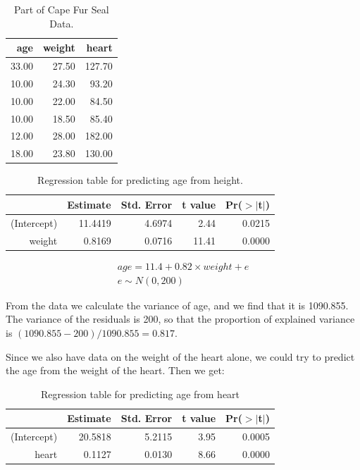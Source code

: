 \documentclass[]{book}\usepackage[]{graphicx}\usepackage[]{color}
\begin{document}
\begin{table}[ht]
\centering
\caption{Part of Cape Fur Seal Data.} 
\label{tab:multi_2}
\begin{tabular}{rrr}
  \hline
age & weight & heart \\ 
  \hline
33.00 & 27.50 & 127.70 \\ 
  10.00 & 24.30 & 93.20 \\ 
  10.00 & 22.00 & 84.50 \\ 
  10.00 & 18.50 & 85.40 \\ 
  12.00 & 28.00 & 182.00 \\ 
  18.00 & 23.80 & 130.00 \\ 
   \hline
\end{tabular}
\end{table}



\begin{table}[ht]
\centering
\caption{Regression table for predicting age from height.} 
\label{tab:multi_2a}
\begin{tabular}{rrrrr}
  \hline
 & Estimate & Std. Error & t value & Pr($>$$|$t$|$) \\ 
  \hline
(Intercept) & 11.4419 & 4.6974 & 2.44 & 0.0215 \\ 
  weight & 0.8169 & 0.0716 & 11.41 & 0.0000 \\ 
   \hline
\end{tabular}
\end{table}



\begin{eqnarray}
age = 11.4 + 0.82 \times  weight + e \\
e \sim N(0, 200)
\end{eqnarray}





From the data we calculate the variance of age, and we find that it is 1090.855. The variance of the residuals is 200, so that the proportion of explained variance is $(1090.855-200)/1090.855  = 0.817$.

Since we also have data on the weight of the heart alone, we could try to predict the age from the weight of the heart. Then we get:

\begin{table}[ht]
\centering
\caption{Regression table for predicting age from heart} 
\label{tab:multi_2b}
\begin{tabular}{rrrrr}
  \hline
 & Estimate & Std. Error & t value & Pr($>$$|$t$|$) \\ 
  \hline
(Intercept) & 20.5818 & 5.2115 & 3.95 & 0.0005 \\ 
  heart & 0.1127 & 0.0130 & 8.66 & 0.0000 \\ 
   \hline
\end{tabular}
\end{table}
\end{document}
